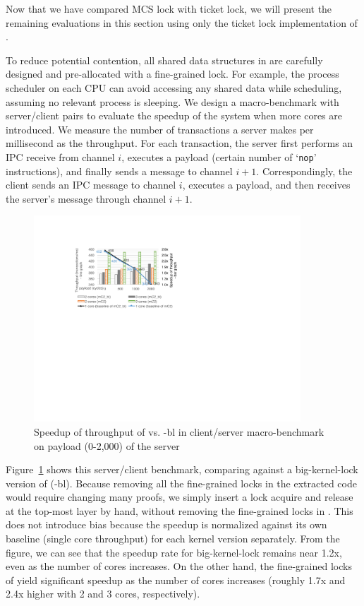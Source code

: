 Now that we have compared MCS lock with ticket lock, we will present the
remaining evaluations in this section using only the ticket lock implementation
of \cCTOS{}.

To reduce potential contention, all shared data
structures in {\cCTOS} are carefully designed and pre-allocated with a
fine-grained lock. For example, the process scheduler on each CPU can
avoid accessing any shared data while scheduling, assuming no relevant process is sleeping.
We design a macro-benchmark with server/client pairs to
evaluate the speedup of the system when more cores are introduced. We measure the
number of transactions a server makes per millisecond as the throughput. For each
transaction, the server first performs an IPC receive from channel $i$, 
executes a payload (certain number of `\texttt{nop}' instructions), and finally
sends a message to channel $i + 1$. Correspondingly, the client sends an
IPC message to channel $i$, executes a payload, and then receives the
server's message through channel $i + 1$.

\begin{figure}\centering
	\hspace{-.2cm}
	\includegraphics[width=10cm]{figs/speedup_big_lock.pdf}
	\hspace{-.2cm}
	\caption{Speedup of throughput of \cCTOS{} vs. {\cCTOS-bl} in client/server macro-benchmark on payload (0-2,000) of the server}
	\label{fig:speedup_big_lock}
	\hrulefill
\end{figure}


Figure~\ref{fig:speedup_big_lock} shows this server/client benchmark, comparing {\cCTOS} against a
big-kernel-lock version of {\cCTOS} ({\cCTOS-bl}). Because removing all the
fine-grained locks in the extracted code would require changing many proofs, we simply
insert a lock acquire and release at the top-most layer by hand, without
removing the fine-grained locks in {\cCTOS}. This does not introduce bias
because the speedup is normalized against its own baseline (single core throughput)
for each kernel version separately.
From the figure, we can see that
the speedup rate for big-kernel-lock remains near 1.2x, even as the
number of cores increases. On the other hand, the fine-grained locks of {\cCTOS}
yield significant speedup as the number of cores increases (roughly
1.7x and 2.4x higher with 2 and 3 cores, respectively).

